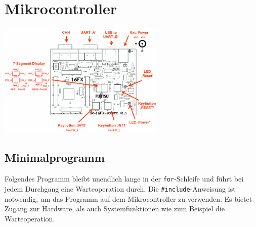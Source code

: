 \section{Mikrocontroller}

\begin{center}
	\includegraphics[width=0.6\textwidth]{figures/starterkit.png}
\end{center}


\subsection{Minimalprogramm}
Folgendes Programm bleibt unendlich lange in der \lstinline|for|-Schleife und führt bei jedem Durchgang eine Warteoperation durch.
Die \lstinline|#include|-Anweisung ist notwendig, um das Programm auf dem Mikrocontroller zu verwenden.
Es bietet Zugang zur Hardware, als auch Systemfunktionen wie zum Beispiel die Warteoperation.



